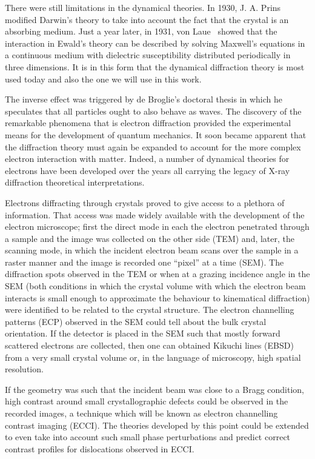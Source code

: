 There were still limitations in the dynamical theories. In 1930, J. A. Prins~\cite{Prins30} modified Darwin's theory to take into account the fact that the crystal is an absorbing medium. Just a year later, in 1931, von Laue~\cite{Laue31} showed that the interaction in Ewald's theory can be described by solving Maxwell's equations in a continuous medium with dielectric susceptibility distributed periodically in three dimensions. It is in this form that the dynamical diffraction theory is most used today and also the one we will use in this work.
  
The inverse effect was triggered by de Broglie's doctoral thesis in which he speculates that all particles ought to also behave as waves. The discovery of the remarkable phenomena that is electron diffraction provided the experimental means for the development of quantum mechanics. It soon became apparent that the diffraction theory must again be expanded to account for the more complex electron interaction with matter. Indeed, a number of dynamical theories for electrons have been developed over the years all carrying the legacy of X-ray diffraction theoretical interpretations.   

Electrons diffracting through crystals proved to give access to a plethora of information. That access was made widely available with the development of the electron microscope; first the direct mode in each the electron penetrated through a sample and the image was collected on the other side (TEM) and, later, the scanning mode, in which the incident electron beam scans over the sample in a raster manner and the image is recorded one ``pixel'' at a time (SEM). The diffraction spots observed in the TEM or when at a grazing incidence angle in the SEM (both conditions in which the crystal volume with which the electron beam interacts is small enough to approximate the behaviour to kinematical diffraction) were identified to be related to the crystal structure. The electron channelling patterns (ECP) observed in the SEM could tell about the bulk crystal orientation. If the detector is placed in the SEM such that mostly forward scattered electrons are collected, then one can obtained Kikuchi lines (EBSD) from a very small crystal volume or, in the language of microscopy, high spatial resolution. 

If the geometry was such that the incident beam was close to a Bragg condition, high contrast around small crystallographic defects could be observed in the recorded images, a technique which will be known as electron channelling contrast imaging (ECCI). The theories developed by this point could be extended to even take into account such small phase perturbations and predict correct contrast profiles for dislocations observed in ECCI. 

